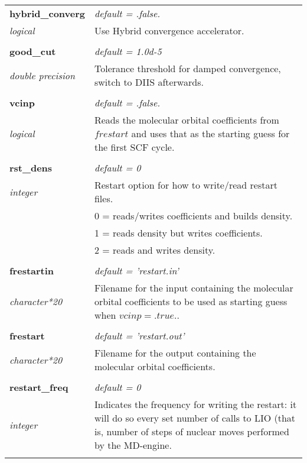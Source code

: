 \begin{Spacing}{1.0}
\begin{longtable}{ p{} p{} }
   \textbf{hybrid\_converg}
   &  \textit{default = .false. }
   \\*\textit{logical}
   & Use Hybrid convergence accelerator.\\* \\

   \textbf{good\_cut}
   &  \textit{default = 1.0d-5}
   \\*\textit{double precision}
   & Tolerance threshold for damped convergence, switch to
   DIIS afterwards.\\* \\

   \textbf{vcinp}
   &  \textit{default = .false. }
   \\*\textit{logical}
   & Reads the molecular orbital coefficients from $frestart$
   and uses that as the starting guess for the first SCF
   cycle.\\* \\

   \textbf{rst\_dens}
   &  \textit{default = 0}
   \\*\textit{integer}
   & Restart option for how to write/read restart files.\\*
   &     0 = reads/writes coefficients and builds density.\\*
   &     1 = reads density but writes coefficients.\\*
   &     2 = reads and writes density.\\*
   \\

   \textbf{frestartin}
   &  \textit{default = 'restart.in'}
   \\*\textit{character*20}
   & Filename for the input containing the molecular orbital
   coefficients to be used as starting guess when $vcinp =
   .true.$.\\* \\

   \textbf{frestart}
   &  \textit{default = 'restart.out'}
   \\*\textit{character*20}
   & Filename for the output containing the molecular orbital 
   coefficients.\\* \\

   \textbf{restart\_freq}
   &  \textit{default = 0}
   \\*\textit{integer}
   & Indicates the frequency for writing the restart: it will
   do so every set number of calls to LIO (that is, number of
   steps of nuclear moves performed by the MD-engine.\\* \\



\end{longtable}
\end{Spacing}
